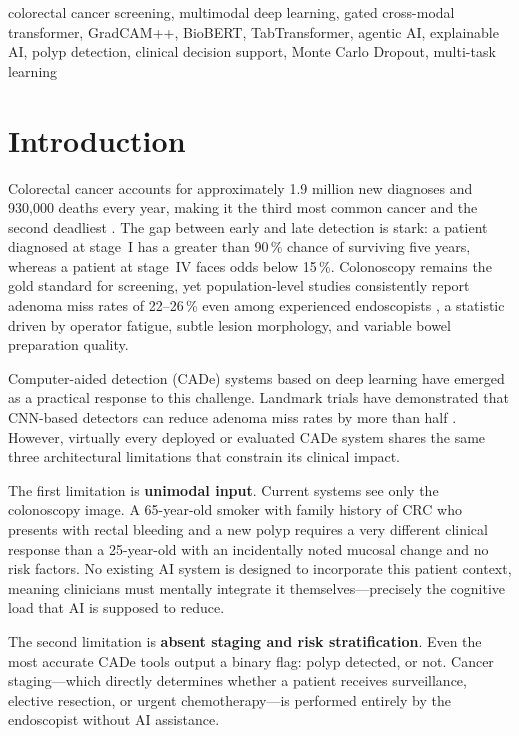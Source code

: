 \documentclass[conference]{IEEEtran}
\begin{document}
\begin{IEEEkeywords}
colorectal cancer screening, multimodal deep learning, gated cross-modal
transformer, GradCAM++, BioBERT, TabTransformer, agentic AI, explainable AI,
polyp detection, clinical decision support, Monte Carlo Dropout, multi-task
learning
\end{IEEEkeywords}

\section{Introduction}

Colorectal cancer accounts for approximately 1.9 million new diagnoses and
930,000 deaths every year, making it the third most common cancer and the
second deadliest \cite{who2020}. The gap between early and late detection is
stark: a patient diagnosed at stage~I has a greater than 90\,\% chance of
surviving five years, whereas a patient at stage~IV faces odds below 15\,\%.
Colonoscopy remains the gold standard for screening, yet population-level
studies consistently report adenoma miss rates of 22--26\,\% even among
experienced endoscopists \cite{rex1997}, a statistic driven by operator
fatigue, subtle lesion morphology, and variable bowel preparation quality.

Computer-aided detection (CADe) systems based on deep learning have emerged
as a practical response to this challenge. Landmark trials have demonstrated
that CNN-based detectors can reduce adenoma miss rates by more than half
\cite{wang2018, urban2018}. However, virtually every deployed or evaluated
CADe system shares the same three architectural limitations that constrain
its clinical impact.

The first limitation is \textbf{unimodal input}. Current systems see only
the colonoscopy image. A 65-year-old smoker with family history of CRC who
presents with rectal bleeding and a new polyp requires a very different clinical
response than a 25-year-old with an incidentally noted mucosal change and no
risk factors. No existing AI system is designed to incorporate this patient
context, meaning clinicians must mentally integrate it themselves---precisely
the cognitive load that AI is supposed to reduce.

The second limitation is \textbf{absent staging and risk stratification}.
Even the most accurate CADe tools output a binary flag: polyp detected, or
not. Cancer staging---which directly determines whether a patient receives
surveillance, elective resection, or urgent chemotherapy---is performed
entirely by the endoscopist without AI assistance.
\end{document}
